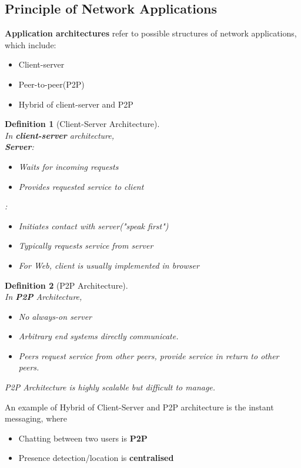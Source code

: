 \documentclass[12pt]{article}
\newtheorem{definition}{Definition}[section]
\theoremstyle{definition}
\begin{document}
\subsection{Principle of Network Applications}
\textbf{Application architectures} refer to possible structures of network applications, which include:
\begin{itemize}
  \item Client-server
  \item Peer-to-peer(P2P)
  \item Hybrid of client-server and P2P
\end{itemize}
\begin{definition}[Client-Server Architecture]
\hfill\\\normalfont In \textbf{client-server} architecture,\\
\textbf{Server}:
\begin{itemize}
  \item Waits for incoming requests
  \item Provides requested service to client
\end{itemize}
:
\begin{itemize}
  \item Initiates contact with server("speak first")
  \item Typically requests service from server
  \item For Web, client is usually implemented in browser
\end{itemize}
\end{definition}
\begin{definition}[P2P Architecture]
\hfill\\\normalfont In \textbf{P2P} Architecture,
\begin{itemize}
\item \textit{No} always-on server
\item Arbitrary end systems directly communicate.
\item Peers request service from other peers, provide service in return to other peers.
\end{itemize}
P2P Architecture is highly scalable but difficult to manage.
\end{definition}
An example of Hybrid of Client-Server and P2P architecture is the instant messaging, where
\begin{itemize}
  \item Chatting between two users is \textbf{P2P}
  \item Presence detection/location is \textbf{centralised}
\end{itemize}
\end{document}
